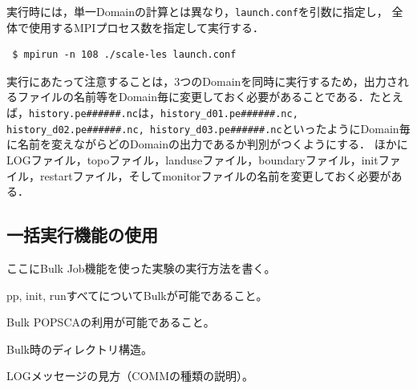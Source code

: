 実行時には，単一Domainの計算とは異なり，\verb|launch.conf|を引数に指定し，
全体で使用するMPIプロセス数を指定して実行する．
\begin{verbatim}
 $ mpirun -n 108 ./scale-les launch.conf
\end{verbatim}

実行にあたって注意することは，3つのDomainを同時に実行するため，出力されるファイルの名前等をDomain毎に変更しておく必要があることである．たとえば，\verb|history.pe######.nc|は，\verb|history_d01.pe######.nc, history_d02.pe######.nc, history_d03.pe######.nc|といったようにDomain毎に名前を変えながらどのDomainの出力であるか判別がつくようにする．
ほかにLOGファイル，topoファイル，landuseファイル，boundaryファイル，initファイル，restartファイル，そしてmonitorファイルの名前を変更しておく必要がある．


\subsection{一括実行機能の使用}

ここにBulk Job機能を使った実験の実行方法を書く。

pp, init, runすべてについてBulkが可能であること。

Bulk POPSCAの利用が可能であること。

Bulk時のディレクトリ構造。

LOGメッセージの見方（COMMの種類の説明）。

